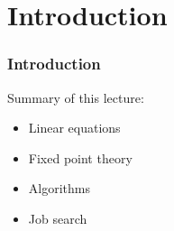 


\subtitle{Prelude to Dynamic Programming}

\author{John Stachurski}

\date{September 2022}




\begin{frame}
  \titlepage
\end{frame}


\section{Introduction}


\begin{frame}
    \frametitle{Introduction}

    Summary of this lecture:

    \begin{itemize}
        \item Linear equations
            \vspace{0.3em}
        \item Fixed point theory
            \vspace{0.3em}
        \item Algorithms
            \vspace{0.3em}
        \item Job search
    \end{itemize}

            \vspace{0.3em}
            \vspace{0.3em}


\end{frame}



    


